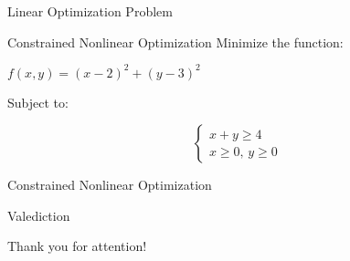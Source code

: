 \documentclass{beamer}
\begin{document}
\begin{frame}{Linear Optimization Problem}
\end{frame}

\begin{frame}{Constrained Nonlinear Optimization}
Minimize the function:
\begin{center}
$f(x, y) = (x - 2)^2 + (y - 3)^2$
\end{center}
Subject to:
\begin{center}
$$\begin{cases}
	x + y \geq 4 \\
	x \geq 0, \, y \geq 0
\end{cases}$$
\end{center}
\end{frame}

\begin{frame}{Constrained Nonlinear Optimization}
\end{frame}

\begin{frame}{Valediction}
\begin{center}
\Huge Thank you for attention!
\end{center}
\end{frame}
\end{document}
